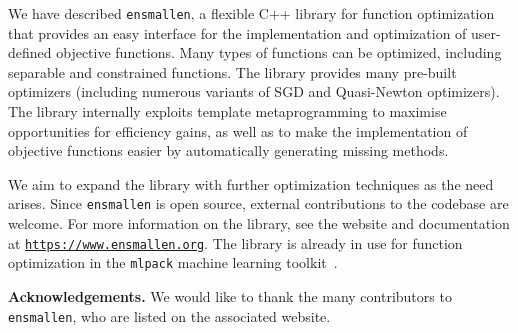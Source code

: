 \documentclass{article}
\begin{document}
We have described {\tt ensmallen}, a flexible C++ library for function
optimization that provides an easy interface for the implementation and optimization
of user-defined objective functions.  Many types of functions can be optimized,
including separable and constrained functions.
The library provides many pre-built optimizers (including numerous variants
of SGD and Quasi-Newton optimizers).
The library internally exploits template metaprogramming
to maximise opportunities for efficiency gains,
as well as 
to make the implementation of objective functions easier
by automatically generating missing methods.

We aim to expand the library with further optimization techniques
as the need arises.  Since {\tt ensmallen} is open source,
external contributions to the codebase are welcome.
For more information on the
library, see the website and documentation at
\href{https://www.ensmallen.org}{\tt\small https://www.ensmallen.org}.
The library is already in use for function optimization in the
\texttt{\small mlpack} machine learning toolkit~\cite{mlpack2018}.

% 

{\bf Acknowledgements.}
We would like to thank the many contributors to {\tt ensmallen},
who are listed on the associated website.

% 





\end{document}
